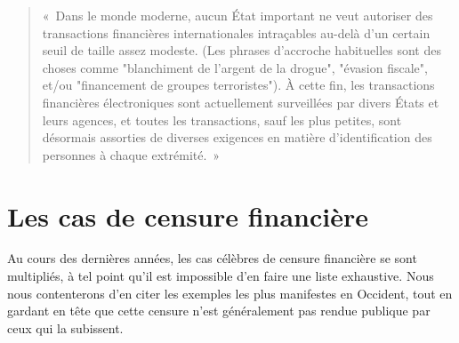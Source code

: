 \begin{quote}
«~Dans le monde moderne, aucun État important ne veut autoriser des transactions financières internationales intraçables au-delà d'un certain seuil de taille assez modeste. (Les phrases d'accroche habituelles sont des choses comme "blanchiment de l'argent de la drogue", "évasion fiscale", et/ou "financement de groupes terroristes"). À cette fin, les transactions financières électroniques sont actuellement surveillées par divers États et leurs agences, et toutes les transactions, sauf les plus petites, sont désormais assorties de diverses exigences en matière d'identification des personnes à chaque extrémité.~»
\end{quote} %

\section*{Les cas de censure financière}


Au cours des dernières années, les cas célèbres de censure financière se sont multipliés, à tel point qu'il est impossible d'en faire une liste exhaustive. Nous nous contenterons d'en citer les exemples les plus manifestes en Occident, tout en gardant en tête que cette censure n'est généralement pas rendue publique par ceux qui la subissent.


